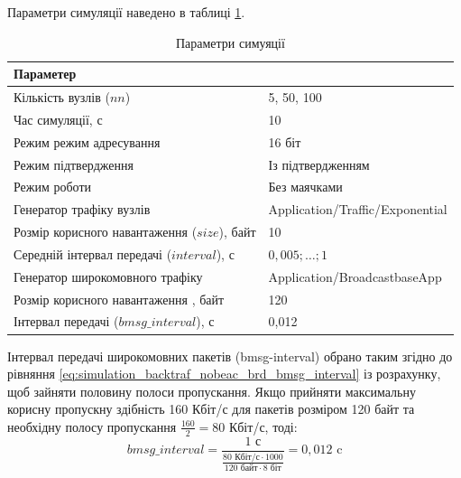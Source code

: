 \documentclass[a4paper,ukrainian,utf8,nocolumnsxix,floatsection,equationsection]{eskdtext}
\begin{document}
Параметри симуляції наведено в таблиці \ref{tbl:simulation_backtraf_nobeac_brd}.

\begin{table}[htbp]
\caption{Параметри симуяції}
\centering
\begin{tabular}{|l|l|}
	\hline
	Параметер                                    &                                 \\ \hline
	Кількість вузлів ($nn$)                      & 5, 50, 100                      \\ \hline
	Час симуляції, с                             & 10                              \\ \hline
	Режим режим адресування                      & 16 біт                          \\ \hline
	Режим підтвердження                          & Із підтвердженням               \\ \hline
	Режим роботи                                 & Без маячками                    \\ \hline
	Генератор трафіку вузлів                     & Application/Traffic/Exponential \\ \hline
	Розмір корисного навантаження ($size$), байт & 10                              \\ \hline
	Середній інтервал передачі ($interval$), с   & $0,005;\dots;1$                 \\ \hline
	Генератор широкомовного трафіку              & Application/BroadcastbaseApp    \\ \hline
	Розмір корисного навантаження , байт         & 120                             \\ \hline
	Інтервал передачі ($bmsg\_interval$), с      & 0,012                           \\ \hline
\end{tabular}
\label{tbl:simulation_backtraf_nobeac_brd}
\end{table}

Інтервал передачі широкомовних пакетів (bmsg-interval) обрано таким згідно до рівняння \ref{eq:simulation_backtraf_nobeac_brd_bmsg_interval} із розрахунку, щоб зайняти половину полоси пропускання. Якщо прийняти максимальну корисну пропускну здібність 160 Кбіт/с для пакетів розміром 120 байт та необхідну полосу пропускання $\frac{160}{2}=80$ Кбіт/с, тоді:
\begin{equation}
	\label{eq:simulation_backtraf_nobeac_brd_bmsg_interval}
	bmsg\_interval = \frac{1 \text{ с}}{\frac{80 \text{ Кбіт/с} \cdot 1000}{120 \text{ байт} \cdot 8 \text{ біт}}} = 0,012 \text{ c}
\end{equation}
\end{document}
